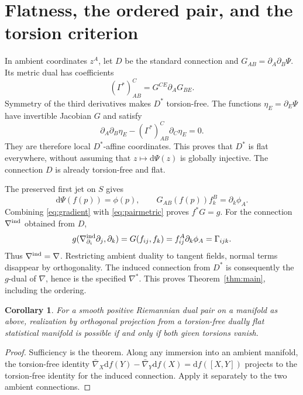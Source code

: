 \documentclass[10pt,letterpaper]{article}
\newtheorem{corollary}[theorem]{Corollary}
\newcommand{\dd}{\mathrm d}
\begin{document}
\section{Flatness, the ordered pair, and the torsion criterion}

In ambient coordinates $z^A$, let $D$ be the standard connection and
$G_{AB}=\partial_A\partial_B\Psi$. Its metric dual has coefficients
\begin{equation}\label{eq:dualcoeff}
 (\Gamma^*)^C_{AB}=G^{CE}\partial_A G_{BE}.
\end{equation}
Symmetry of the third derivatives makes $D^*$ torsion-free. The functions
$\eta_E=\partial_E\Psi$ have invertible Jacobian $G$ and satisfy
\[
 \partial_A\partial_B\eta_E
       -(\Gamma^*)^C_{AB}\partial_C\eta_E=0.
\]
They are therefore local $D^*$-affine coordinates. This proves that $D^*$
is flat everywhere, without assuming that $z\mapsto\dd\Psi(z)$ is globally
injective. The connection $D$ is already torsion-free and flat.

The preserved first jet on $S$ gives
\begin{equation}\label{eq:gradient}
 \dd\Psi(f(p))=\phi(p),\qquad
 G_{AB}(f(p)) f_k^B=\partial_k\phi_A.
\end{equation}
Combining \eqref{eq:gradient} with \eqref{eq:pairmetric} proves $f^*G=g$.
For the connection $\nabla^{\rm ind}$ obtained from $D$,
\[
 g(\nabla^{\rm ind}_{\partial_i}\partial_j,\partial_k)
 =G(f_{ij},f_k)=f_{ij}^A\partial_k\phi_A=\Gamma_{ijk}.
\]
Thus $\nabla^{\rm ind}=\nabla$. Restricting ambient duality to tangent
fields, normal terms disappear by orthogonality. The induced connection
from $D^*$ is consequently the $g$-dual of $\nabla$, hence is the specified
$\nabla^*$. This proves Theorem~\ref{thm:main}, including the ordering.

\begin{corollary}\label{cor:torsion}
For a smooth positive Riemannian dual pair on a manifold as above,
realization by orthogonal projection from a torsion-free dually flat
statistical manifold is possible if and only if both given torsions vanish.
\end{corollary}
\begin{proof}
Sufficiency is the theorem. Along any immersion into an ambient manifold,
the torsion-free identity
$\bar\nabla_X\dd f(Y)-\bar\nabla_Y\dd f(X)=\dd f([X,Y])$
projects to the torsion-free identity for the induced connection.
Apply it separately to the two ambient connections.
\end{proof}
\end{document}
